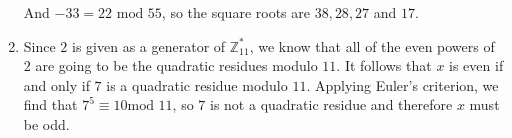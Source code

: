 \begin{enumerate}
And $-33 = 22 \textrm{ mod } 55$, so the square roots are $38, 28, 27$ and
$17$.

\item Since $2$ is given as a generator of $\mathbb{Z}_{11}^{*}$, we know that
all of the even powers of $2$ are going to be the quadratic residues modulo
$11$. It follows that $x$ is even if and only if $7$ is a quadratic residue
modulo $11$. Applying Euler's criterion, we find that $7^5 \equiv 10 \textrm{
mod } 11$, so $7$ is not a quadratic residue and therefore $x$ must be odd.

\end{enumerate}
